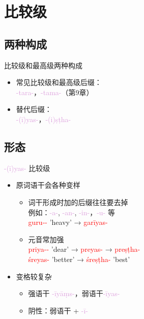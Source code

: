 \documentclass[17pt]{beamer}
\newcommand{\nounstem}[1]{\textcolor{red}{#1\nobreakdash-}}
\newcommand{\pratyaya}[1]{\mbox{\textcolor{Plum}{#1}}}
\begin{document}
\section{比较级}
\begin{frame}{\insertsection}
  \small
  \tableofcontents[currentsection]
\end{frame}

\subsection{两种构成}
\begin{frame}{比较级和最高级两种构成}
  \begin{itemize}
    \item 常见比较级和最高级后缀：\\
    \pratyaya{-tara-}，\pratyaya{-tama-}（第9章）
    \item 替代后缀：\\
    \pratyaya{-(ī)yas-}，\pratyaya{-(i)ṣṭha-}
  \end{itemize}
\end{frame}

\subsection{形态}
\begin{frame}{\pratyaya{-(ī)yas-} 比较级~~ \insertsubsection}
  \small
  \begin{itemize}
    \item 原词语干会各种变样
    \begin{itemize}
      \item 词干形成时加的后缀往往要去掉\\
      例如：\pratyaya{-a-}, \pratyaya{-an-}, \pratyaya{-in-}，\pratyaya{-u-} 等\\
      \nounstem{guru-} 'heavy' → \nounstem{garīyas} \\
      \item 元音常加强\\
      \nounstem{priya-} 'dear' → \nounstem{preyas} 
      → \nounstem{preṣṭha} \\
      \nounstem{śreyas} 'better' → \nounstem{śreṣṭha} 'best'
    \end{itemize}
    \item 变格较复杂
    \begin{itemize}
      \item 强语干 \pratyaya{-īyāṃs-}，弱语干\pratyaya{-īyas-}\\
      \item 阴性：弱语干 + \pratyaya{-ī-}
    \end{itemize}
  \end{itemize}
\end{frame}
\end{document}
